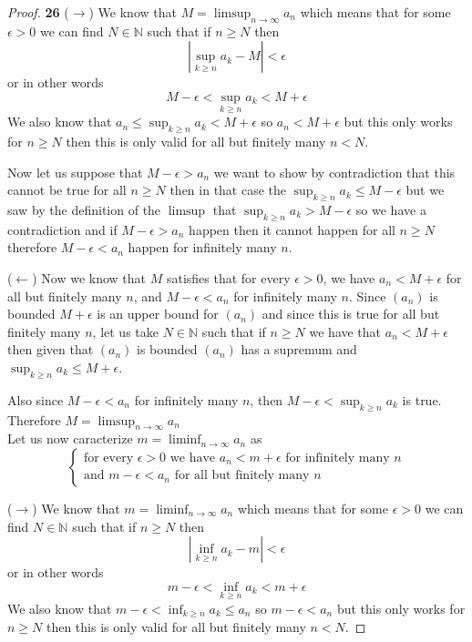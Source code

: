 \documentclass[11pt]{article}
\newcommand{\N}{\mathbb{N}}
\theoremstyle{definition}
\begin{document}
    \begin{proof}{\textbf{26}}
        ($\rightarrow$)  We know that $M = \limsup_{n \to \infty} a_n$ which means that
        for some $\epsilon>0$ we can find $N \in \N$ such that if $n\geq N$ then
        $$|\sup_{k \geq n}a_k - M|< \epsilon$$
        or in other words
        $$M - \epsilon<\sup_{k \geq n}a_k < M+\epsilon$$
        We also know that $a_n \leq \sup_{k \geq n}a_k < M+\epsilon$ so
        $a_n < M+\epsilon$ but this only works for $n\geq N$ then this is
        only valid for all but finitely many $n<N$.
        
        Now let us suppose that $M-\epsilon > a_n$  we want to show by contradiction
        that this cannot be true for all $n \geq N$ then in that case the
        $\sup_{k \geq n} a_k \leq M -\epsilon$ but we saw by the definition of the
        $\limsup$ that $\sup_{k \geq n} a_k > M - \epsilon$ so we have a
        contradiction and if  $M-\epsilon > a_n$ happen then it cannot happen for all
        $n\geq N$ therefore $M-\epsilon<a_n$ happen for infinitely many $n$.

        ($\leftarrow$) Now we know that $M$ satisfies that for every $\epsilon >0$,
        we have $a_n < M+\epsilon$  for all but finitely many $n$, and $M-\epsilon<a_n$
        for infinitely many $n$.
        Since $(a_n)$ is bounded $M+\epsilon$ is an upper bound for $(a_n)$ and since
        this is true for all but finitely many $n$, let us take $N \in \N$ such that if
        $n \geq N$ we have that  $a_n < M + \epsilon$ then given that $(a_n)$ is bounded
        $(a_n)$ has a supremum and $\sup_{k\geq n} a_k \leq M+\epsilon$.

        Also since $M-\epsilon<a_n$ for infinitely many $n$, then
        $M - \epsilon < \sup_{k\geq n} a_k$ is true.
        Therefore $M = \limsup_{n\to \infty} a_n$\\
        
        Let us now caracterize $m = \liminf_{n \to \infty} a_n$ as
        \begin{equation*}
            \begin{cases}
                \text{for every $\epsilon>0$ we have $a_n<m+\epsilon$ for infinitely many $n$}\\
                \text{and $m-\epsilon < a_n$ for all but finitely many $n$}
            \end{cases}
        \end{equation*}

        ($\rightarrow$)  We know that $m = \liminf_{n \to \infty} a_n$ which means that
        for some $\epsilon>0$ we can find $N \in \N$ such that if $n\geq N$ then
        $$|\inf_{k \geq n}a_k - m|< \epsilon$$
        or in other words
        $$m - \epsilon<\inf_{k \geq n}a_k < m+\epsilon$$
        We also know that $m-\epsilon < \inf_{k \geq n} a_k \leq a_n$ so
        $m -\epsilon < a_n$ but this only works for $n\geq N$ then this is
        only valid for all but finitely many $n<N$.
        

\end{proof}
\end{document}
